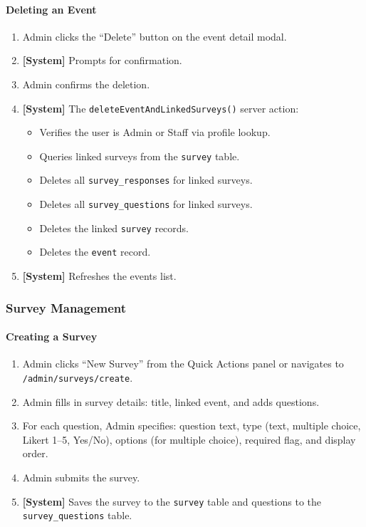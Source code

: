 \documentclass[11pt,a4paper]{article}
\begin{document}
\paragraph{Deleting an Event}
\begin{enumerate}[leftmargin=1.5em]
  \item Admin clicks the ``Delete'' button on the event detail modal.
  \item \textbf{[System]} Prompts for confirmation.
  \item Admin confirms the deletion.
  \item \textbf{[System]} The \texttt{deleteEventAndLinkedSurveys()} server action:
    \begin{itemize}
      \item Verifies the user is Admin or Staff via profile lookup.
      \item Queries linked surveys from the \texttt{survey} table.
      \item Deletes all \texttt{survey\_responses} for linked surveys.
      \item Deletes all \texttt{survey\_questions} for linked surveys.
      \item Deletes the linked \texttt{survey} records.
      \item Deletes the \texttt{event} record.
    \end{itemize}
  \item \textbf{[System]} Refreshes the events list.
\end{enumerate}


\subsubsection{Survey Management}

\paragraph{Creating a Survey}
\begin{enumerate}[leftmargin=1.5em]
  \item Admin clicks ``New Survey'' from the Quick Actions panel or navigates to \texttt{/admin/surveys/create}.
  \item Admin fills in survey details: title, linked event, and adds questions.
  \item For each question, Admin specifies: question text, type (text, multiple choice, Likert 1--5, Yes/No), options (for multiple choice), required flag, and display order.
  \item Admin submits the survey.
  \item \textbf{[System]} Saves the survey to the \texttt{survey} table and questions to the \texttt{survey\_questions} table.
\end{enumerate}
\end{document}
